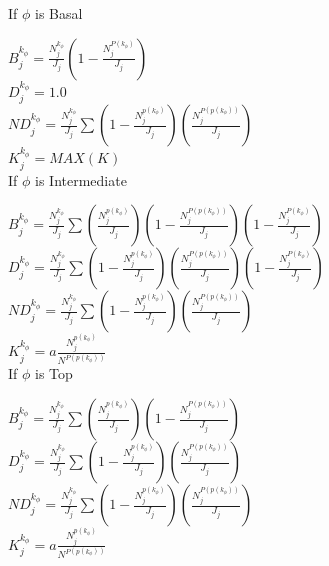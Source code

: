 
If $\phi$ is Basal

$B^{k_{\phi}}_{j} = \frac{N^{k_{\phi}}_{j}}{J_{j}} (1-\frac{N^{P(k_{\phi})}_{j}}{J_{j}})$ \\ 
$D^{k_{\phi}}_{j} = 1.0 $ \\
$ND^{k_{\phi}}_{j} = \frac{N^{k_{\phi}}_{j}}{J_{j}} \sum (1-\frac{N^{p(k_{\phi})}_{j}}{J_{j}}) (\frac{N^{P(p(k_{\phi}))}_{j}}{J_{j}})$ \\
$K^{k_{\phi}}_{j} = MAX(K)$ \\

If $\phi$ is Intermediate

$B^{k_{\phi}}_{j} = \frac{N^{k_{\phi}}_{j}}{J_{j}} \sum (\frac{N^{p(k_{\phi})}_{j}}{J_{j}}) (1-\frac{N^{P(p(k_{\phi}))}_{j}}{J_{j}}) (1-\frac{N^{P(k_{\phi})}_{j}}{J_{j}})$  \\
$D^{k_{\phi}}_{j} = \frac{N^{k_{\phi}}_{j}}{J_{j}} \sum (1 - \frac{N^{p(k_{\phi})}_{j}}{J_{j}}) (\frac{N^{P(p(k_{\phi}))}_{j}}{J_{j}}) (1-\frac{N^{P(k_{\phi})}_{j}}{J_{j}})$ \\
$ND^{k_{\phi}}_{j} = \frac{N^{k_{\phi}}_{j}}{J_{j}} \sum (1-\frac{N^{p(k_{\phi})}_{j}}{J_{j}}) (\frac{N^{P(p(k_{\phi}))}_{j}}{J_{j}})$ \\
$K^{k_{\phi}}_{j} = a \frac{N^{p(k_{\phi})}_{j}}{N^{P(p(k_{\phi}))}}$ \\

If $\phi$ is Top 

$B^{k_{\phi}}_{j} = \frac{N^{k_{\phi}}_{j}}{J_{j}} \sum (\frac{N^{p(k_{\phi})}_{j}}{J_{j}}) (1-\frac{N^{P(p(k_{\phi}))}_{j}}{J_{j}})$  \\
$D^{k_{\phi}}_{j} = \frac{N^{k_{\phi}}_{j}}{J_{j}} \sum (1 - \frac{N^{p(k_{\phi})}_{j}}{J_{j}}) (\frac{N^{P(p(k_{\phi}))}_{j}}{J_{j}})$ \\
$ND^{k_{\phi}}_{j} = \frac{N^{k_{\phi}}_{j}}{J_{j}} \sum (1-\frac{N^{p(k_{\phi})}_{j}}{J_{j}}) (\frac{N^{P(p(k_{\phi}))}_{j}}{J_{j}})$ \\
$K^{k_{\phi}}_{j} = a \frac{N^{p(k_{\phi})}_{j}}{N^{P(p(k_{\phi}))}}$ \\



